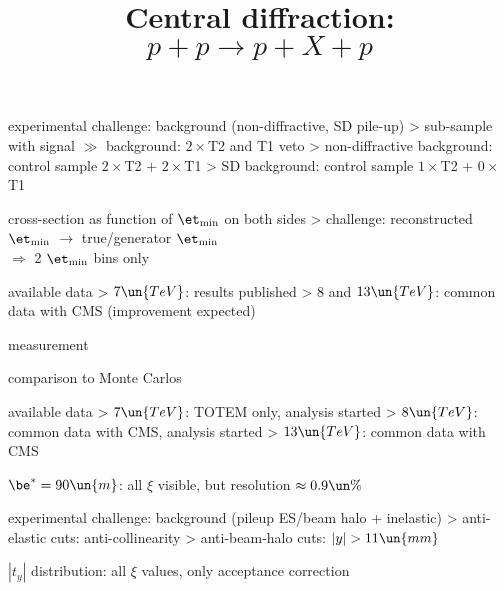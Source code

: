 \> experimental challenge: background (non-diffractive, SD pile-up)
\>> sub-sample with signal $\gg$ background:  $2\times$T2 and T1 veto
\>> non-diffractive background: control sample $2\times$T2 + $2\times$T1
\>> SD background: control sample $1\times$T2 + $0\times$T1

\> cross-section as function of $\et_{\rm min}$ on both sides
\>> challenge: reconstructed $\et_{\rm min}$ $\longrightarrow$ true/generator $\et_{\rm min}$\\
$\Rightarrow$ 2 $\et_{\rm min}$ bins only

\> available data
\>> $7\un{TeV}$: results published
\>> $8$ and $13\un{TeV}$: common data with CMS (improvement expected)

\newpage %

\> measurement

\centerline{}

\> comparison to Monte Carlos

\centerline{}

\newpage %
\title{Central diffraction: $p + p \rightarrow p + X + p$}

\centerline{}

\> available data
\>> $7\un{TeV}$: TOTEM only, analysis started
\>> $8\un{TeV}$: common data with CMS, analysis started
\>> $13\un{TeV}$: common data with CMS

\> $\be^* = 90\un{m}$: all $\xi$ visible, but resolution $\approx 0.9\un{\%}$

\> experimental challenge: background (pileup ES/beam halo + inelastic)
\>> anti-elastic cuts: anti-collinearity
\>> anti-beam-halo cuts: $|y| > 11\un{mm}$

\newpage %

\> $|t_y|$ distribution: all $\xi$ values, only acceptance correction


